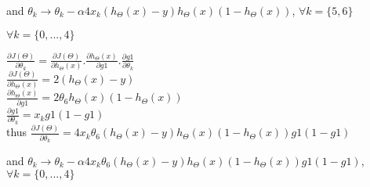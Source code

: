 \documentclass[10pt]{article}
\begin{document}
and $\theta_{k} \to \theta_{k} - \alpha 4 x_{k} (h_{\Theta}(x) - y) h_{\Theta}(x) (1 - h_{\Theta}(x))$, $\forall k = \{5, 6\}$ \\

\bigskip

$\forall k = \{0, ..., 4\}$ \\ \bigskip

$\frac{\partial J(\Theta)}{\partial \theta_{k}} = \frac{\partial J(\Theta)}{\partial h_{\Theta}(x)} . \frac{\partial h_{\Theta}(x)}{\partial g1} . \frac{\partial g1}{\partial \theta_{k}}$\\
$\frac{\partial J(\Theta)}{\partial h_{\Theta}(x)} = 2 (h_{\Theta}(x) - y)$ \\
$\frac{\partial h_{\Theta}(x)}{\partial g1} = 2 \theta_{6} h_{\Theta}(x) (1 - h_{\Theta}(x))$\\
$\frac{\partial g1}{\partial \theta_{k}} = x_{k} g1 (1 - g1)$\\
thus $\frac{\partial J(\Theta)}{\partial \theta_{k}} = 4 x_{k} \theta_{6} (h_{\Theta}(x) - y) h_{\Theta}(x) (1 - h_{\Theta}(x)) g1 (1 - g1)$ \\ \bigskip

and $\theta_{k} \to \theta_{k} - \alpha 4 x_{k} \theta_{6} (h_{\Theta}(x) - y) h_{\Theta}(x) (1 - h_{\Theta}(x)) g1 (1 - g1)$, $\forall k = \{0, ..., 4\}$
\end{document}
